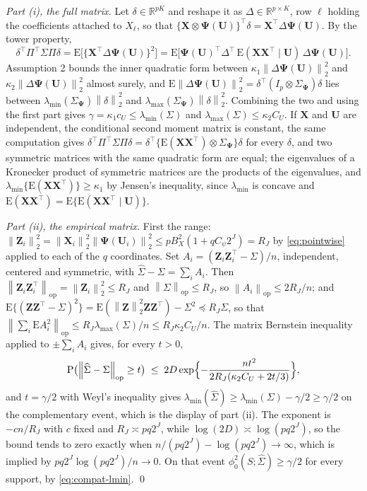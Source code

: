\documentclass[10pt]{book}
\theoremstyle{definition}
\newcommand{\R}{\mathbb{R}}
\newcommand{\E}{\mathrm{E}}
\newcommand{\Prob}{\mathrm{P}}
\newcommand{\T}{^{\top}}
\newcommand{\norm}[1]{\left\lVert #1 \right\rVert}
\newcommand{\cv}{\ell}
\newcommand{\bX}{\mathbf{X}}
\newcommand{\bU}{\mathbf{U}}
\newcommand{\bZ}{\mathbf{Z}}
\newcommand{\Gram}{\Sigma}
\newcommand{\Gramhat}{\widehat{\Sigma}}
\newcommand{\bPsi}{\boldsymbol{\Psi}}
\newcommand{\lmin}{\lambda_{\min}}
\newcommand{\lmaxx}{\lambda_{\max}}
\newcommand{\opnorm}[1]{\left\lVert #1 \right\rVert_{\mathrm{op}}}
\newcommand{\compat}{\phi_{0}}
\begin{document}
\emph{Part (i), the full matrix.} Let $\delta \in \R^{pK}$ and reshape it as
$\Delta \in \R^{p\times K}$, row $\cv$ holding the coefficients attached to
$X_{\cv}$, so that $\{\bX\otimes\bPsi(\bU)\}\T\delta = \bX\T\Delta\bPsi(\bU)$.
By the tower property,
\[
  \delta\T\Pi\T\Gram\Pi\delta
  = \E\bigl[\{\bX\T\Delta\bPsi(\bU)\}^2\bigr]
  = \E\bigl[\bPsi(\bU)\T\Delta\T\,\E(\bX\bX\T\mid\bU)\,\Delta\bPsi(\bU)\bigr].
\]
Assumption 2 bounds the inner quadratic form between
$\kappa_1\norm{\Delta\bPsi(\bU)}_2^2$ and $\kappa_2\norm{\Delta\bPsi(\bU)}_2^2$
almost surely, and
$\E\norm{\Delta\bPsi(\bU)}_2^2 = \delta\T(I_p\otimes\Gram_{\bPsi})\delta$ lies
between $\lmin(\Gram_{\bPsi})\norm{\delta}_2^2$ and
$\lmaxx(\Gram_{\bPsi})\norm{\delta}_2^2$. Combining the two and using the
first part gives $\gamma = \kappa_1c_U \le \lmin(\Gram)$ and
$\lmaxx(\Gram) \le \kappa_2C_U$. If $\bX$ and $\bU$ are independent, the
conditional second moment matrix is constant, the same computation gives
$\delta\T\Pi\T\Gram\Pi\delta = \delta\T\{\E(\bX\bX\T)\otimes\Gram_{\bPsi}\}
\delta$ for every $\delta$, and two symmetric matrices with the same quadratic
form are equal; the eigenvalues of a Kronecker product of symmetric matrices
are the products of the eigenvalues, and
$\lmin\{\E(\bX\bX\T)\} \ge \kappa_1$ by Jensen's inequality, since $\lmin$ is
concave and $\E(\bX\bX\T) = \E\{\E(\bX\bX\T\mid\bU)\}$.

\emph{Part (ii), the empirical matrix.} First the range:
$\norm{\bZ_i}_2^2 = \norm{\bX_i}_2^2\norm{\bPsi(\bU_i)}_2^2 \le
pB_X^2(1+qC_\psi2^J) = R_J$ by \eqref{eq:pointwise} applied to each of the $q$
coordinates. Set $A_i = (\bZ_i\bZ_i\T-\Gram)/n$, independent, centered and
symmetric, with $\Gramhat - \Gram = \sum_i A_i$. Then
$\opnorm{\bZ_i\bZ_i\T} = \norm{\bZ_i}_2^2 \le R_J$ and
$\opnorm{\Gram} \le R_J$, so $\opnorm{A_i} \le 2R_J/n$; and
$\E\{(\bZ\bZ\T-\Gram)^2\} = \E(\norm{\bZ}_2^2\bZ\bZ\T) - \Gram^2 \preceq
R_J\Gram$, so that
$\opnorm{\sum_i\E A_i^2} \le R_J\lmaxx(\Gram)/n \le R_J\kappa_2C_U/n$. The
matrix Bernstein inequality \citep[Theorem 1.4]{tropp2012user} applied to
$\pm\sum_iA_i$ gives, for every $t>0$,
\[
  \Prob\bigl(\opnorm{\Gramhat-\Gram} \ge t\bigr)
  \;\le\; 2D\exp\Bigl\{-\frac{nt^2}{2R_J(\kappa_2C_U+2t/3)}\Bigr\},
\]
and $t = \gamma/2$ with Weyl's inequality gives
$\lmin(\Gramhat) \ge \lmin(\Gram)-\gamma/2 \ge \gamma/2$ on the complementary
event, which is the display of part (ii). The exponent is $-cn/R_J$ with $c$
fixed and $R_J \asymp pq2^J$, while $\log(2D) \asymp \log(pq2^J)$, so the
bound tends to zero exactly when $n/(pq2^J) - \log(pq2^J) \to \infty$, which
is implied by $pq2^J\log(pq2^J)/n \to 0$. On that event
$\compat^2(S;\Gramhat) \ge \gamma/2$ for every support, by
\eqref{eq:compat-lmin}. \qed
\end{document}
